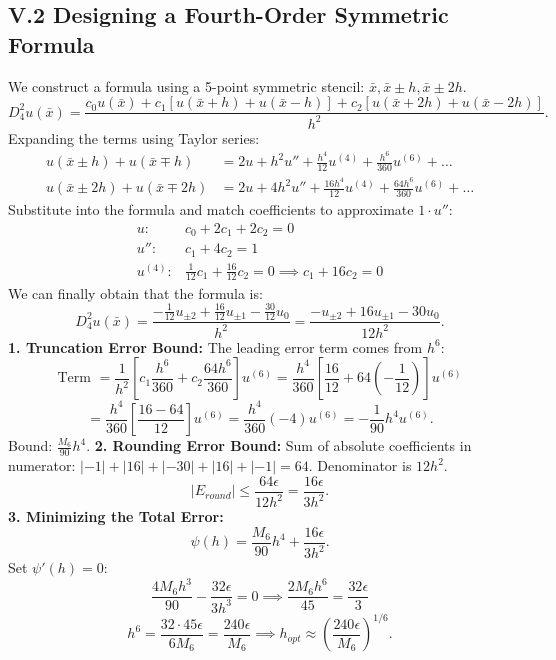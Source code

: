 \documentclass[a4paper]{article}
\begin{document}
\subsection*{V.2 Designing a Fourth-Order Symmetric Formula}
We construct a formula using a 5-point symmetric stencil: $\bar{x}, \bar{x} \pm h, \bar{x} \pm 2h$.
\[
D_{4}^2 u(\bar{x}) = \frac{c_0 u(\bar{x}) + c_1 [u(\bar{x}+h) + u(\bar{x}-h)] + c_2 [u(\bar{x}+2h) + u(\bar{x}-2h)]}{h^2}.
\]
Expanding the terms using Taylor series:
\begin{align*}
u(\bar{x} \pm h) + u(\bar{x} \mp h) &= 2u + h^2 u'' + \frac{h^4}{12} u^{(4)} + \frac{h^6}{360} u^{(6)} + \dots \\
u(\bar{x} \pm 2h) + u(\bar{x} \mp 2h) &= 2u + 4h^2 u'' + \frac{16h^4}{12} u^{(4)} + \frac{64h^6}{360} u^{(6)} + \dots
\end{align*}
Substitute into the formula and match coefficients to approximate $1 \cdot u''$:
\begin{align}
u: & c_0 + 2c_1 + 2c_2 = 0 \\
u'': & c_1 + 4c_2 = 1 \\
u^{(4)}: & \frac{1}{12} c_1 + \frac{16}{12} c_2 = 0 \implies c_1 + 16c_2 = 0
\end{align}
We can finally obtain that the formula is:
\[
D_4^2 u(\bar{x}) = \frac{-\frac{1}{12}u_{\pm 2} + \frac{16}{12}u_{\pm 1} - \frac{30}{12}u_0}{h^2} = \frac{-u_{\pm 2} + 16u_{\pm 1} - 30u_0}{12h^2}.
\]
\newline
\textbf{1. Truncation Error Bound:}
The leading error term comes from $h^6$:
\[
\text{Term } = \frac{1}{h^2} \left[ c_1 \frac{h^6}{360} + c_2 \frac{64h^6}{360} \right] u^{(6)} = \frac{h^4}{360} \left[ \frac{16}{12} + 64(-\frac{1}{12}) \right] u^{(6)}
\]
\[
= \frac{h^4}{360} \left[ \frac{16 - 64}{12} \right] u^{(6)} = \frac{h^4}{360} (-4) u^{(6)} = -\frac{1}{90} h^4 u^{(6)}.
\]
Bound: $\frac{M_6}{90} h^4$.\newline
\textbf{2. Rounding Error Bound:}
Sum of absolute coefficients in numerator: $|-1| + |16| + |-30| + |16| + |-1| = 64$.
Denominator is $12h^2$.
\[
|E_{round}| \le \frac{64\epsilon}{12h^2} = \frac{16\epsilon}{3h^2}.
\]
\textbf{3. Minimizing the Total Error:}
\[
\psi(h) = \frac{M_6}{90} h^4 + \frac{16\epsilon}{3h^2}.
\]
Set $\psi'(h) = 0$:
\[
\frac{4 M_6 h^3}{90} - \frac{32\epsilon}{3h^3} = 0 \implies \frac{2 M_6 h^6}{45} = \frac{32\epsilon}{3}
\]
\[
h^6 = \frac{32 \cdot 45 \epsilon}{6 M_6} = \frac{240\epsilon}{M_6} \implies h_{opt} \approx \left( \frac{240\epsilon}{M_6} \right)^{1/6}.
\]
\end{document}
